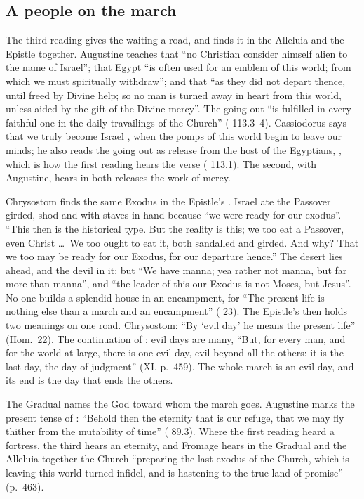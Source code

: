\subsection{A people on the march}

The third reading gives the waiting a road, and finds it in the Alleluia and the
Epistle together. Augustine teaches that ``no Christian consider himself alien to
the name of Israel''; that Egypt ``is often used for an emblem of this world;
from which we must spiritually withdraw''; and that ``as they did not depart
thence, until freed by Divine help; so no man is turned away in heart from this
world, unless aided by the gift of the Divine mercy''. The going out ``is fulfilled
in every faithful one in the daily travailings of the Church'' (
113.3--4). Cassiodorus says that we truly become Israel , when the pomps of this world begin to
leave our minds; he also reads the going out as release from the host of the
Egyptians, , which is how the first reading hears
the verse ( 113.1). The second, with Augustine, hears in
both releases the work of mercy.

Chrysostom finds the same Exodus in the Epistle's . Israel ate the Passover girded, shod and with staves in hand
because ``we were ready for our exodus''. ``This then is the historical type. But
the reality is this; we too eat a Passover, even Christ \dots\ We too ought to eat
it, both sandalled and girded. And why? That we too may be ready for our Exodus,
for our departure hence.'' The desert lies ahead, and the devil in it; but ``We
have manna; yea rather not manna, but far more than manna'', and ``the leader of
this our Exodus is not Moses, but Jesus''. No one builds a splendid house in an
encampment, for ``The present life is nothing else than a march and an
encampment'' ( 23). The Epistle's 
then holds two meanings on one road. Chrysostom: ``By `evil day' he means the
present life'' (Hom.~22). The continuation of : evil
days are many, ``But, for every man, and for the world at large, there is one
evil day, evil beyond all the others: it is the last day, the day of judgment''
(XI, p.~459). The whole march is an evil day, and its end is the day that ends
the others.

The Gradual names the God toward whom the march goes. Augustine marks the
present tense of : ``Behold then the eternity that is our
refuge, that we may fly thither from the mutability of time'' (
89.3). Where the first reading heard a fortress, the third hears an eternity, and
Fromage hears in the Gradual and the Alleluia together the Church ``preparing the
last exodus of the Church, which is leaving this world turned infidel, and is
hastening to the true land of promise'' (p.~463).

